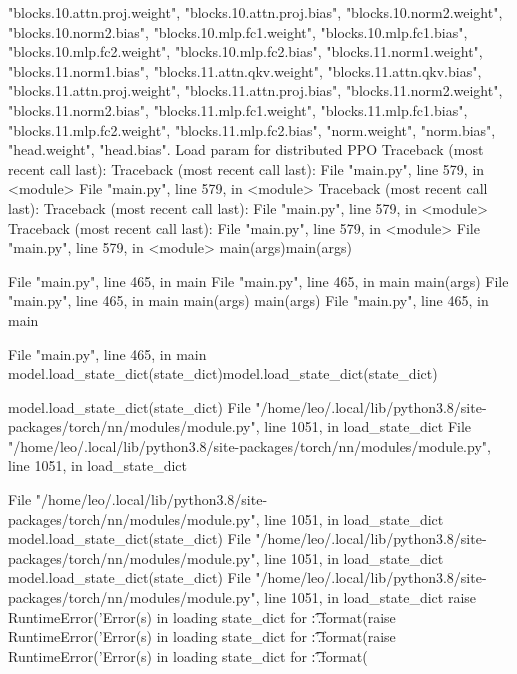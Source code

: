 "blocks.10.attn.proj.weight", "blocks.10.attn.proj.bias", "blocks.10.norm2.weight", "blocks.10.norm2.bias", "blocks.10.mlp.fc1.weight", "blocks.10.mlp.fc1.bias", "blocks.10.mlp.fc2.weight", "blocks.10.mlp.fc2.bias", "blocks.11.norm1.weight", "blocks.11.norm1.bias", "blocks.11.attn.qkv.weight", "blocks.11.attn.qkv.bias", "blocks.11.attn.proj.weight", "blocks.11.attn.proj.bias", "blocks.11.norm2.weight", "blocks.11.norm2.bias", "blocks.11.mlp.fc1.weight", "blocks.11.mlp.fc1.bias", "blocks.11.mlp.fc2.weight", "blocks.11.mlp.fc2.bias", "norm.weight", "norm.bias", "head.weight", "head.bias". 
Load param for distributed PPO
Traceback (most recent call last):
Traceback (most recent call last):
  File "main.py", line 579, in <module>
  File "main.py", line 579, in <module>
Traceback (most recent call last):
Traceback (most recent call last):
  File "main.py", line 579, in <module>
Traceback (most recent call last):
  File "main.py", line 579, in <module>
  File "main.py", line 579, in <module>
        main(args)main(args)

      File "main.py", line 465, in main
  File "main.py", line 465, in main
main(args)
  File "main.py", line 465, in main
    main(args)    
main(args)  File "main.py", line 465, in main

  File "main.py", line 465, in main
        model.load_state_dict(state_dict)model.load_state_dict(state_dict)    

model.load_state_dict(state_dict)  File "/home/leo/.local/lib/python3.8/site-packages/torch/nn/modules/module.py", line 1051, in load_state_dict
  File "/home/leo/.local/lib/python3.8/site-packages/torch/nn/modules/module.py", line 1051, in load_state_dict

      File "/home/leo/.local/lib/python3.8/site-packages/torch/nn/modules/module.py", line 1051, in load_state_dict
model.load_state_dict(state_dict)
      File "/home/leo/.local/lib/python3.8/site-packages/torch/nn/modules/module.py", line 1051, in load_state_dict
model.load_state_dict(state_dict)
  File "/home/leo/.local/lib/python3.8/site-packages/torch/nn/modules/module.py", line 1051, in load_state_dict
            raise RuntimeError('Error(s) in loading state_dict for {}:\n\t{}'.format(raise RuntimeError('Error(s) in loading state_dict for {}:\n\t{}'.format(raise RuntimeError('Error(s) in loading state_dict for {}:\n\t{}'.format(


